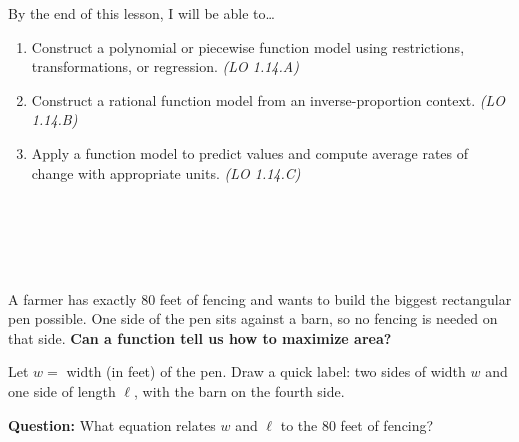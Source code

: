 \documentclass[10pt]{article}
\begin{document}
\namedateperiod

\vspace{0.08in}

\begin{objectivebox}
By the end of this lesson, I will be able to\ldots
\begin{enumerate}[itemsep=2pt]
  \item Construct a polynomial or piecewise function model using restrictions, transformations,
        or regression. \hfill\textit{(LO 1.14.A)}
  \item Construct a rational function model from an inverse-proportion context. \hfill\textit{(LO 1.14.B)}
  \item Apply a function model to predict values and compute average rates of change
        with appropriate units. \hfill\textit{(LO 1.14.C)}
\end{enumerate}
\end{objectivebox}

\vspace{0.06in}

\begin{vocabbox}
 \\[2pt]
 \\[2pt]
 \\[2pt]
 \\[2pt]
 
\end{vocabbox}

\vspace{0.06in}

\begin{hookbox}
A farmer has exactly 80 feet of fencing and wants to build the biggest rectangular pen possible.
One side of the pen sits against a barn, so no fencing is needed on that side.
\textbf{Can a function tell us how to maximize area?}

\medskip
Let $w = $ width (in feet) of the pen. Draw a quick label: two sides of width $w$ and one side
of length $\ell$, with the barn on the fourth side.

\medskip
\textbf{Question:} What equation relates $w$ and $\ell$ to the 80 feet of fencing?

\vspace{0.06in}
\end{hookbox}
\end{document}
